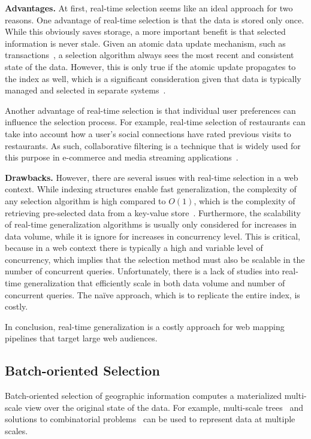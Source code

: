 \documentclass[11pt, oneside]{report}
\newcommand{\minisec}[1]{\noindent\textbf{#1.}}
\begin{document}
{\minisec{Advantages}
At first, real-time selection seems like an ideal approach for two reasons. One advantage of real-time selection is that the data is stored only once. While this obviously saves storage, a more important benefit is that selected information is never stale. Given an atomic data update mechanism, such as transactions~\cite{gray1981transaction}, a selection algorithm always sees the most recent and consistent state of the data. However, this is only true if the atomic update propagates to the index as well, which is a significant consideration given that data is typically managed and selected in separate systems~\cite{bereuter2013real,sarma2012fusiontables}.

Another advantage of real-time selection is that individual user preferences can influence the selection process. For example, real-time selection of restaurants can take into account how a user's social connections have rated previous visits to restaurants. As such, collaborative filtering is a technique that is widely used for this purpose in e-commerce and media streaming applications~\cite{herlocker2004evaluating}.

\minisec{Drawbacks}
However, there are several issues with real-time selection in a web context. While indexing structures enable fast generalization, the complexity of any selection algorithm is high compared to $O(1)$, which is the complexity of retrieving pre-selected data from a key-value store~\cite{pilchin2007dynamo}. Furthermore, the scalability of real-time generalization algorithms is usually only considered for increases in data volume, while it is ignore for increases in concurrency level. This is critical, because in a web context there is typically a high and variable level of concurrency, which implies that the selection method must also be scalable in the number of concurrent queries. Unfortunately, there is a lack of studies into real-time generalization that efficiently scale in both data volume and number of concurrent queries. The na{\"i}ve approach, which is to replicate the entire index, is costly.

In conclusion, real-time generalization is a costly approach for web mapping pipelines that target large web audiences.

\subsection{Batch-oriented Selection}
Batch-oriented selection of geographic information computes a materialized multi-scale view over the original state of the data. For example, multi-scale trees~\cite{frank1994multiscaletree,van2011towards} and solutions to combinatorial problems~\cite{sarma2012fusiontables} can be used to represent data at multiple scales.

}
\end{document}
